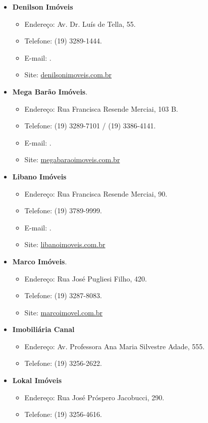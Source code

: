 \begin{itemize}
\item  \textbf{Denilson Imóveis}
\begin{itemize}
\item  Endereço: Av. Dr. Luís de Tella, 55.
\item  Telefone: (19) 3289-1444.
\item  E-mail: .
\item  Site: \url{denilsonimoveis.com.br}
\end{itemize}

\item  \textbf{Mega Barão Imóveis}.
\begin{itemize}
\item  Endereço: Rua Francisca Resende Merciai, 103 B.
\item  Telefone: (19) 3289-7101 / (19) 3386-4141.
\item  E-mail: .
\item  Site: \url{megabaraoimoveis.com.br}
\end{itemize}

\item  \textbf{Libano Imóveis}
\begin{itemize}
\item  Endereço: Rua Francisca Resende Merciai, 90.
\item  Telefone: (19) 3789-9999.
\item  E-mail: .
\item  Site: \url{libanoimoveis.com.br}
\end{itemize}

\item  \textbf{Marco Imóveis}.
\begin{itemize}
\item  Endereço: Rua José Pugliesi Filho, 420.
\item  Telefone: (19) 3287-8083.
\item  Site: \url{marcoimovel.com.br}
\end{itemize}

\item  \textbf{Imobiliária Canal}
\begin{itemize}
\item  Endereço: Av. Professora Ana Maria Silvestre Adade, 555.
\item  Telefone: (19) 3256-2622.
\end{itemize}

\item  \textbf{Lokal Imóveis}
\begin{itemize}
\item  Endereço: Rua José Próspero Jacobucci, 290.
\item  Telefone: (19) 3256-4616.
\end{itemize}


\end{itemize}
